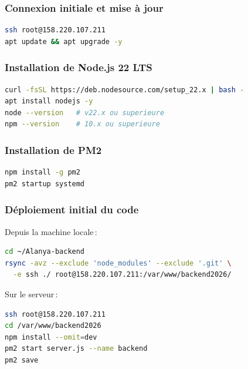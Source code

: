 \documentclass[11pt,a4paper,oneside]{report}
\begin{document}
\subsubsection{Connexion initiale et mise \`{a} jour}
\begin{lstlisting}[language=bash,caption={Connexion SSH et mise \`{a} jour du syst\`{e}me},captionpos=b]
ssh root@158.220.107.211
apt update && apt upgrade -y
\end{lstlisting}

\subsubsection{Installation de Node.js 22 LTS}
\begin{lstlisting}[language=bash,caption={Installation de Node.js 22},captionpos=b]
curl -fsSL https://deb.nodesource.com/setup_22.x | bash -
apt install nodejs -y
node --version   # v22.x ou superieure
npm --version    # 10.x ou superieure
\end{lstlisting}

\subsubsection{Installation de PM2}
\begin{lstlisting}[language=bash,caption={Installation du gestionnaire de processus PM2},captionpos=b]
npm install -g pm2
pm2 startup systemd
\end{lstlisting}

\subsubsection{D\'{e}ploiement initial du code}
Depuis la machine locale\,:
\begin{lstlisting}[language=bash,caption={Copie des fichiers vers le serveur (rsync)},captionpos=b]
cd ~/Alanya-backend
rsync -avz --exclude 'node_modules' --exclude '.git' \
  -e ssh ./ root@158.220.107.211:/var/www/backend2026/
\end{lstlisting}
Sur le serveur\,:
\begin{lstlisting}[language=bash,caption={Installation des d\'{e}pendances et d\'{e}marrage},captionpos=b]
ssh root@158.220.107.211
cd /var/www/backend2026
npm install --omit=dev
pm2 start server.js --name backend
pm2 save
\end{lstlisting}
\end{document}
